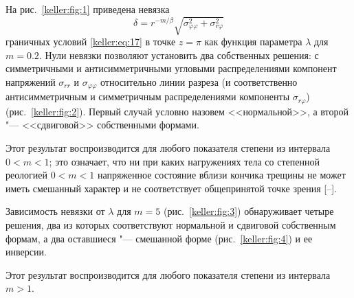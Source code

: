 На рис.~\ref{keller:fig:1} приведена невязка $$\delta=r^{-m/\beta}\sqrt{\sigma_{\varphi\varphi}^2+\sigma_{r\varphi}^2}$$ граничных условий \eqref{keller:eq:17} в точке $z=\pi$ как функция параметра $\lambda$ для ${m=0.2}.$ Нули невязки позволяют установить два собственных решения: с симметричными и антисимметричными угловыми распределениями компонент напряжений $\sigma_{rr}$ и $\sigma_{\varphi\varphi}$ относительно линии разреза (и соответственно антисимметричным и симметричным распределениями компоненты $\sigma_{r\varphi}$) (рис.~\ref{keller:fig:2}). Первый случай условно назовем <<нормальной>>, а второй "--- <<сдвиговой>> собственными формами. 

Этот результат воспроизводится для любого показателя степени из интервала $0<m<1$; это означает, что ни при каких нагружениях тела со степенной реологией $0<m<1$ напряженное состояние вблизи кончика трещины не может иметь смешанный характер и не соответствует общепринятой точке зрения [--]. 







Зависимость невязки от $\lambda$ для $m=5$ (рис.~\ref{keller:fig:3}) обнаруживает четыре решения, два из которых соответствуют нормальной и сдвиговой собственным формам, а два оставшиеся "--- смешанной форме (рис.~\ref{keller:fig:4}) и ее инверсии. 

Этот результат воспроизводится для любого показателя степени из интервала $m>1.$  





